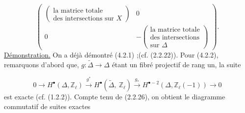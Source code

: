 \begin{equation*}
\left(
\begin{array}{c|c}
\left(\begin{array}{l}\mbox{la matrice totale}\\ \mbox{des intersections sur } X\end{array}\right) & 0 \\ \hline
0 & -\left(\begin{array}{l}\mbox{la matrice totale}\\ \mbox{des intersections}\\ \mbox{sur } \Delta\end{array}\right)
\end{array}
\right) .
\end{equation*}
\underline{Démonstration.}  On a déjà démontré (4.2.1) ;(cf. (2.2.22)). Pour (4.2.2), remarquons d'abord que, $g : \widetilde{\Delta} \longrightarrow \Delta$ étant un fibré projectif de rang un, la suite

\begin{equation}\tag{4.2.4}
0 \longrightarrow H^{\bullet}(\Delta,\mathbb{Z}_{\ell}) \stackrel{g^{*}}{\longrightarrow} H^{\bullet}(\widetilde{\Delta},\ \mathbb{Z}_{\ell}) \stackrel{g_{*}}{\longrightarrow} H^{\bullet-2}(\Delta,\mathbb{Z}_{\ell}(-1)) \longrightarrow 0
\end{equation}
est exacte (cf. (1.2.2)). Compte tenu de (2.2.26), on obtient le diagramme commutatif  de suites exactes

